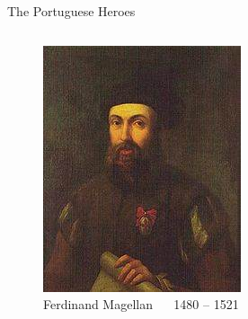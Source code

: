 \documentclass{beamer}
\begin{document}
\begin{frame}{The Portuguese Heroes}
\begin{columns}
	\begin{figure}[ht]
	\begin{center}
	\includegraphics[width=0.9 \columnwidth]{Magellan.jpg}
	\caption{\tiny Ferdinand Magellan ~~ 1480 – 1521}
	\end{center}
	\end{figure}
\end{columns}

\end{frame}
\end{document}
